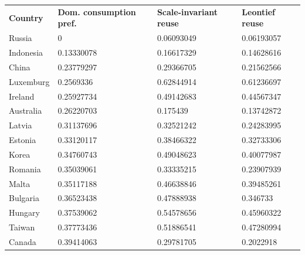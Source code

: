 \documentclass[english]{uzhpub}
\begin{document}
\begin{table}[]
\centering
\begin{tabular}{llll}
\textbf{Country}                                           & \textbf{Dom. consumption pref.}       & \textbf{Scale-invariant reuse} & \textbf{Leontief reuse} \\
Russia                                                     & 0          & 0.06093049            & 0.06193057     \\
Indonesia                                                  & 0.13330078 & 0.16617329            & 0.14628616     \\
China                                                      & 0.23779297 & 0.29366705            & 0.21562566     \\
Luxemburg                                                  & 0.2569336  & 0.62844914            & 0.61236697     \\
Ireland                                                    & 0.25927734 & 0.49142683            & 0.44567347     \\
Australia                                                  & 0.26220703 & 0.175439              & 0.13742872     \\
Latvia                                                     & 0.31137696 & 0.32521242            & 0.24283995     \\
Estonia                                                    & 0.33120117 & 0.38466322            & 0.32733306     \\
Korea                                                      & 0.34760743 & 0.49048623            & 0.40077987     \\
Romania                                                    & 0.35039061 & 0.33335215            & 0.23907939     \\
Malta                                                      & 0.35117188 & 0.46638846            & 0.39485261     \\
Bulgaria                                                   & 0.36523438 & 0.47888938            & 0.346733       \\
Hungary                                                    & 0.37539062 & 0.54578656            & 0.45960322     \\
Taiwan                                                     & 0.37773436 & 0.51886541            & 0.47280994     \\
Canada                                                     & 0.39414063 & 0.29781705            & 0.2022918      \\

\end{tabular}
\end{table}
\end{document}
